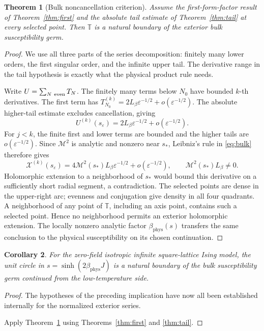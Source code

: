 \documentclass[11pt]{article}
\numberwithin{equation}{section}
\newtheorem{theorem}{Theorem}[section]
\newtheorem{corollary}[theorem]{Corollary}
\theoremstyle{definition}
\newcommand{\T}{\mathbb T}
\newcommand{\eps}{\varepsilon}
\newcommand{\M}{\mathcal M}
\newcommand{\sstar}{s_*}
\newcommand{\se}{s_\varepsilon}
\begin{document}
\begin{theorem}[Bulk noncancellation criterion]\label{thm:conditional}
Assume the first-form-factor result of Theorem~\ref{thm:first} and
the absolute tail estimate of Theorem~\ref{thm:tail} at every
selected point. Then \(\T\) is a natural boundary of the exterior
bulk susceptibility germ.
\end{theorem}
\begin{proof}
We use all three parts of the series decomposition: finitely many lower orders, the first singular order, and the infinite upper tail. The derivative range in the tail hypothesis is exactly what the physical product rule needs.

Write \(U=\sum_{N\ {\rm even}}T_N\).
The finitely many terms below \(N_0\) have bounded \(k\)-th derivatives.
The first term has
\(T_{N_0}^{(k)}=2L_\beta\eps^{-1/2}+o(\eps^{-1/2})\).
The absolute higher-tail estimate excludes cancellation, giving
\[
 U^{(k)}(\se)=2L_\beta\eps^{-1/2}+o(\eps^{-1/2}).
\]
For \(j<k\), the finite first and lower terms are bounded and the
higher tails are \(o(\eps^{-1/2})\). Since \(\M^2\) is analytic and
nonzero near \(\sstar\), Leibniz's rule in \eqref{eq:bulk} therefore gives
\[
 \mathcal X^{(k)}(\se)
 =4\M^2(\sstar)L_\beta\eps^{-1/2}+o(\eps^{-1/2}),
 \qquad \M^2(\sstar)L_\beta\ne0.
\]
Holomorphic extension to a neighborhood of \(\sstar\) would bound this
derivative on a sufficiently short radial segment, a contradiction.
The selected points are dense in the upper-right arc; evenness and
conjugation give density in all four quadrants. A neighborhood of
any point of \(\T\), including an axis point, contains such a selected
point. Hence no neighborhood permits an exterior holomorphic extension.
The locally nonzero analytic factor \(\beta_{\mathrm{phys}}(s)\) transfers the same
conclusion to the physical susceptibility on its chosen continuation.
\end{proof}

\begin{corollary}\label{thm:nb}
For the zero-field isotropic infinite square-lattice Ising model, the
unit circle in \(s=\sinh(2\beta_{\mathrm{phys}} J)\) is a natural boundary of the bulk
susceptibility germ continued from the low-temperature side.
\end{corollary}
\begin{proof}
The hypotheses of the preceding implication have now all been established internally for the normalized exterior series.

Apply Theorem~\ref{thm:conditional} using Theorems~\ref{thm:first}
and \ref{thm:tail}.
\end{proof}
\end{document}
